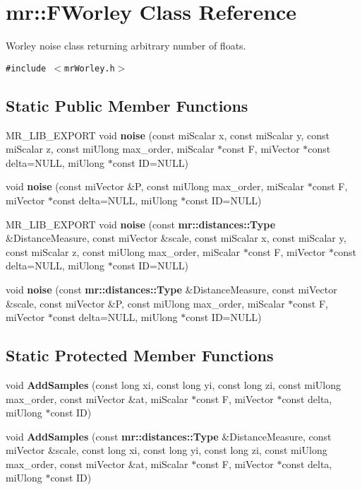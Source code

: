 \section{mr::FWorley Class Reference}
\label{classmr_1_1FWorley}
Worley noise class returning arbitrary number of floats.  


{\tt \#include $<$mr\-Worley.h$>$}

\subsection*{Static Public Member Functions}
\begin{CompactItemize}
\item 
MR\_\-LIB\_\-EXPORT void {\bf noise} (const mi\-Scalar x, const mi\-Scalar y, const mi\-Scalar z, const mi\-Ulong max\_\-order, mi\-Scalar $\ast$const F, mi\-Vector $\ast$const delta=NULL, mi\-Ulong $\ast$const ID=NULL)
\item 
void {\bf noise} (const mi\-Vector \&P, const mi\-Ulong max\_\-order, mi\-Scalar $\ast$const F, mi\-Vector $\ast$const delta=NULL, mi\-Ulong $\ast$const ID=NULL)
\item 
MR\_\-LIB\_\-EXPORT void {\bf noise} (const {\bf mr::distances::Type} \&Distance\-Measure, const mi\-Vector \&scale, const mi\-Scalar x, const mi\-Scalar y, const mi\-Scalar z, const mi\-Ulong max\_\-order, mi\-Scalar $\ast$const F, mi\-Vector $\ast$const delta=NULL, mi\-Ulong $\ast$const ID=NULL)
\item 
void {\bf noise} (const {\bf mr::distances::Type} \&Distance\-Measure, const mi\-Vector \&scale, const mi\-Vector \&P, const mi\-Ulong max\_\-order, mi\-Scalar $\ast$const F, mi\-Vector $\ast$const delta=NULL, mi\-Ulong $\ast$const ID=NULL)
\end{CompactItemize}
\subsection*{Static Protected Member Functions}
\begin{CompactItemize}
\item 
void {\bf Add\-Samples} (const long xi, const long yi, const long zi, const mi\-Ulong max\_\-order, const mi\-Vector \&at, mi\-Scalar $\ast$const F, mi\-Vector $\ast$const delta, mi\-Ulong $\ast$const ID)
\item 
void {\bf Add\-Samples} (const {\bf mr::distances::Type} \&Distance\-Measure, const mi\-Vector \&scale, const long xi, const long yi, const long zi, const mi\-Ulong max\_\-order, const mi\-Vector \&at, mi\-Scalar $\ast$const F, mi\-Vector $\ast$const delta, mi\-Ulong $\ast$const ID)
\end{CompactItemize}


